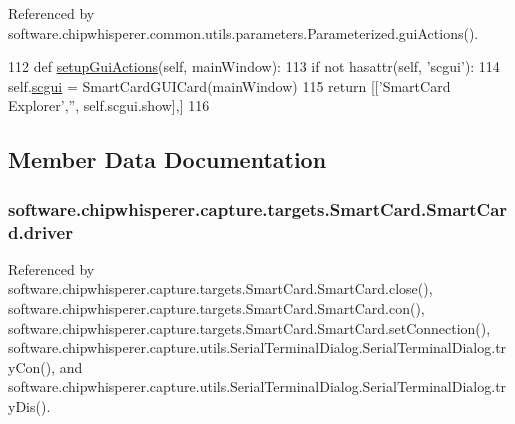 Referenced by software.\+chipwhisperer.\+common.\+utils.\+parameters.\+Parameterized.\+gui\+Actions().


\begin{DoxyCode}
112     \textcolor{keyword}{def }\hyperlink{classsoftware_1_1chipwhisperer_1_1capture_1_1targets_1_1SmartCard_1_1SmartCard_a62d2f520a189e617015ea8aa66815ab1}{setupGuiActions}(self, mainWindow):
113         \textcolor{keywordflow}{if} \textcolor{keywordflow}{not} hasattr(self, \textcolor{stringliteral}{'scgui'}):
114             self.\hyperlink{classsoftware_1_1chipwhisperer_1_1capture_1_1targets_1_1SmartCard_1_1SmartCard_acb4bd44ef4b1ad21a36cf91e962b9de4}{scgui} = SmartCardGUICard(mainWindow)
115         \textcolor{keywordflow}{return} [[\textcolor{stringliteral}{'SmartCard Explorer'},\textcolor{stringliteral}{''}, self.scgui.show],]
116 \end{DoxyCode}


\subsection{Member Data Documentation}
\hypertarget{classsoftware_1_1chipwhisperer_1_1capture_1_1targets_1_1SmartCard_1_1SmartCard_a5baa55d0e921b83a3f98c05589c21e1a}{}
\subsubsection[{driver}]{\setlength{\rightskip}{0pt plus 5cm}software.\+chipwhisperer.\+capture.\+targets.\+Smart\+Card.\+Smart\+Card.\+driver}\label{classsoftware_1_1chipwhisperer_1_1capture_1_1targets_1_1SmartCard_1_1SmartCard_a5baa55d0e921b83a3f98c05589c21e1a}


Referenced by software.\+chipwhisperer.\+capture.\+targets.\+Smart\+Card.\+Smart\+Card.\+close(), software.\+chipwhisperer.\+capture.\+targets.\+Smart\+Card.\+Smart\+Card.\+con(), software.\+chipwhisperer.\+capture.\+targets.\+Smart\+Card.\+Smart\+Card.\+set\+Connection(), software.\+chipwhisperer.\+capture.\+utils.\+Serial\+Terminal\+Dialog.\+Serial\+Terminal\+Dialog.\+try\+Con(), and software.\+chipwhisperer.\+capture.\+utils.\+Serial\+Terminal\+Dialog.\+Serial\+Terminal\+Dialog.\+try\+Dis().

